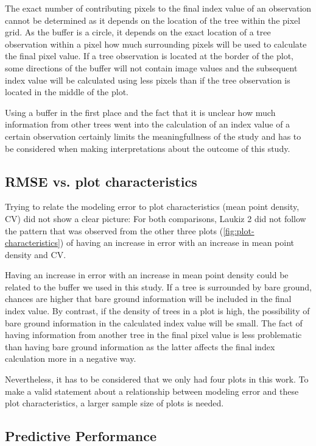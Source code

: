 \documentclass[review]{elsarticle}
\begin{document}
The exact number of contributing pixels to the final index value of an observation cannot be determined as it depends on the location of the tree within the pixel grid.
As the buffer is a circle, it depends on the exact location of a tree observation within a pixel how much surrounding pixels will be used to calculate the final pixel value.
If a tree observation is located at the border of the plot, some directions of the buffer will not contain image values and the subsequent index value will be calculated using less pixels than if the tree observation is located in the middle of the plot.

Using a buffer in the first place and the fact that it is unclear how much information from other trees went into the calculation of an index value of a certain observation certainly limits the meaningfullness of the study and has to be considered when making interpretations about the outcome of this study.

\subsection{RMSE vs. plot characteristics}

Trying to relate the modeling error to plot characteristics (mean point density, CV) did not show a clear picture: For both comparisons, Laukiz 2 did not follow the pattern that was observed from the other three plots (\autoref{fig:plot-characteristics}) of having an increase in error with an increase in mean point density and CV.

Having an increase in error with an increase in mean point density could be related to the buffer we used in this study.
If a tree is surrounded by bare ground, chances are higher that bare ground information will be included in the final index value.
By contrast, if the density of trees in a plot is high, the possibility of bare ground information in the calculated index value will be small.
The fact of having information from another tree in the final pixel value is less problematic than having bare ground information as the latter affects the final index calculation more in a negative way.

Nevertheless, it has to be considered that we only had four plots in this work.
To make a valid statement about a relationship between modeling error and these plot characteristics, a larger sample size of plots is needed.

\subsection{Predictive Performance}
\end{document}
